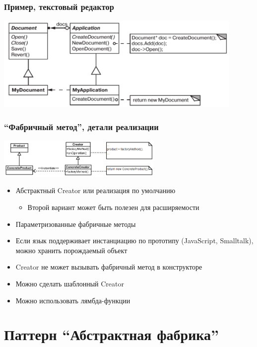 \documentclass{../cscslides}
\begin{document}
    \begin{frame}
        \frametitle{Пример, текстовый редактор}
        \begin{center}
            \includegraphics[width=0.9\textwidth]{factoryMethodForTextEditor.png}
        \end{center}
    \end{frame}

    \begin{frame}
        \frametitle{``Фабричный метод'', детали реализации}
        \begin{center}
            \includegraphics[width=0.6\textwidth]{factoryMethod.png}
        \end{center}
        \begin{itemize}
            \item Абстрактный Creator или реализация по умолчанию
            \begin{itemize}
                \item Второй вариант может быть полезен для расширяемости
            \end{itemize}
            \item Параметризованные фабричные методы
            \item Если язык поддерживает инстанциацию по прототипу (JavaScript, Smalltalk), можно хранить порождаемый объект
            \item Creator не может вызывать фабричный метод в конструкторе
            \item Можно сделать шаблонный Creator
            \item Можно использовать лямбда-функции
        \end{itemize}
    \end{frame}

    \section{Паттерн ``Абстрактная фабрика''}
\end{document}
